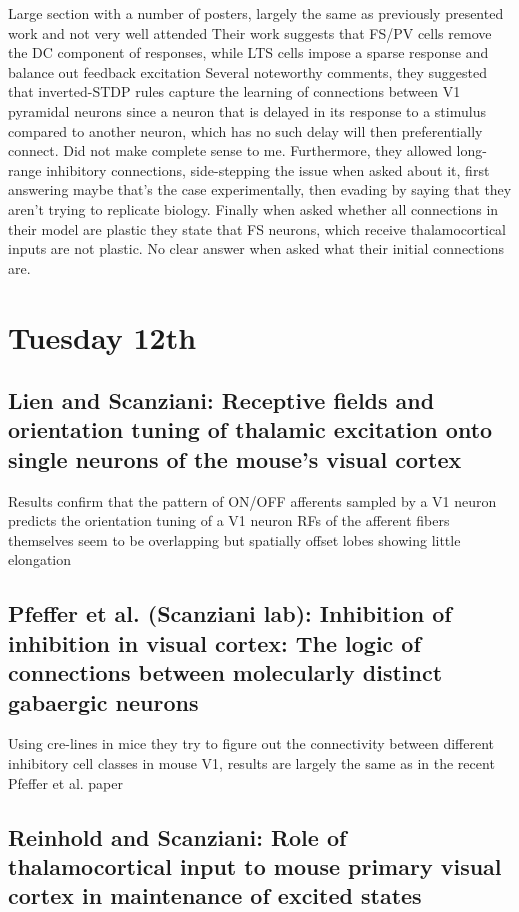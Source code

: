 \documentclass[11pt]{Science}
\begin{document}
Large section with a number of posters, largely the same as previously presented work and not very well attended
Their work suggests that FS/PV cells remove the DC component of responses, while LTS cells impose a sparse response and balance out feedback excitation
Several noteworthy comments, they suggested that inverted-STDP rules capture the learning of connections between V1 pyramidal neurons since a neuron that is delayed in its response to a stimulus compared to another neuron, which has no such delay will then preferentially connect. Did not make complete sense to me. Furthermore, they allowed long-range inhibitory connections, side-stepping the issue when asked about it, first answering maybe that's the case experimentally, then evading by saying that they aren't trying to replicate biology. Finally when asked whether all connections in their model are plastic they state that FS neurons, which receive thalamocortical inputs are not plastic. No clear answer when asked what their initial connections are.


\section{Tuesday 12th}
\label{sec-3}


\subsection{Lien and Scanziani: Receptive fields and orientation tuning of thalamic excitation onto single neurons of the mouse’s visual cortex}
\label{sec-3.1}


Results confirm that the pattern of ON/OFF afferents sampled by a V1 neuron predicts the orientation tuning of a V1 neuron
RFs of the afferent fibers themselves seem to be overlapping but spatially offset lobes showing little elongation

\subsection{Pfeffer et al. (Scanziani lab): Inhibition of inhibition in visual cortex: The logic of connections between molecularly distinct gabaergic neurons}
\label{sec-3.2}


Using cre-lines in mice they try to figure out the connectivity between different inhibitory cell classes in mouse V1, results are largely the same as in the recent Pfeffer et al. paper

\subsection{Reinhold and Scanziani: Role of thalamocortical input to mouse primary visual cortex in maintenance of excited states}
\label{sec-3.3}
\end{document}
